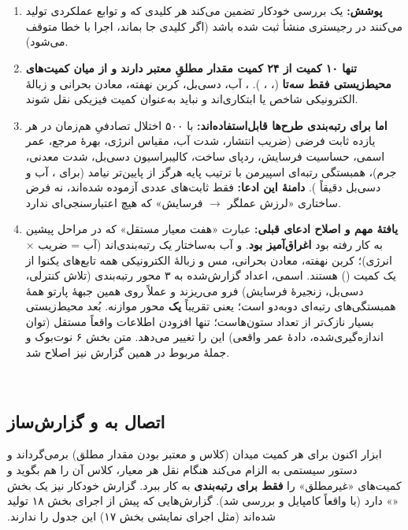 ‫\documentclass[a4paper,12pt]{article}
\begin{document}
‫\begin{enumerate}
‫\item \textbf{پوشش:} یک بررسی خودکار تضمین می‌کند هر کلیدی که  و توابع عملکردی تولید می‌کنند در رجیستری منشأ ثبت شده باشد (اگر کلیدی جا بماند، اجرا با خطا متوقف می‌شود).
‫\item \textbf{تنها ۱۰ کمیت از ۲۴ کمیت مقدار مطلقِ معتبر دارند و از میان کمیت‌های محیط‌زیستی فقط سه‌تا} (\texttt{}، \texttt{}، \texttt{}). ، آب، دسی‌بل، کربن نهفته، معادن بحرانی و زبالهٔ الکترونیکی شاخص یا ابتکاری‌اند و نباید به‌عنوان کمیت فیزیکی نقل شوند.
‫\item \textbf{اما برای رتبه‌بندی طرح‌ها قابل‌استفاده‌اند:} با ۵۰۰ اختلال تصادفیِ هم‌زمان در هر یازده ثابت فرضی (ضریب انتشار، شدت آب، مقیاس انرژی، بهرهٔ مرجع، عمر اسمی، حساسیت فرسایش، ردپای ساخت، کالیبراسیون دسی‌بل، شدت معدنی، جرم)، همبستگی رتبه‌ای اسپیرمن با ترتیب پایه هرگز از  پایین‌تر نیامد (برای ، آب و دسی‌بل دقیقاً ). \textbf{دامنهٔ این ادعا:} فقط ثابت‌های عددی آزموده شده‌اند، نه فرض ساختاری «لرزش عملگر $\to$ فرسایش» که هیچ اعتبارسنجی‌ای ندارد.
‫\item \textbf{یافتهٔ مهم و اصلاح ادعای قبلی:} عبارت «هفت معیار مستقل» که در مراحل پیشین به کار رفته بود \textbf{اغراق‌آمیز بود}.  و آب به‌ساختار یک رتبه‌بندی‌اند (آب = ضریب $\times$ انرژی)؛ کربن نهفته، معادن بحرانی، مس و زبالهٔ الکترونیکی همه تابع‌های یکنوا از یک کمیت (\texttt{}) هستند. اسمی، اعداد گزارش‌شده به ۳ محور رتبه‌بندی (تلاش کنترلی، دسی‌بل، زنجیرهٔ فرسایش) فرو می‌ریزند و عملاً روی همین جبههٔ پارتو همهٔ همبستگی‌های رتبه‌ای دوبه‌دو  است؛ یعنی تقریباً \textbf{یک} محور موازنه. بُعد محیط‌زیستی بسیار نازک‌تر از تعداد ستون‌هاست؛ تنها افزودن اطلاعات واقعاً مستقل (توان اندازه‌گیری‌شده، دادهٔ عمر واقعی) این را تغییر می‌دهد. متن بخش ۶ نوت‌بوک و جملهٔ مربوط در همین گزارش نیز اصلاح شد.
‫\end{enumerate}
‫
‫\subsection{اتصال به  و گزارش‌ساز}
‫ابزار \texttt{} اکنون برای هر کمیت میدان \texttt{} (کلاس و معتبر بودن مقدار مطلق) برمی‌گرداند و دستور سیستمی به  الزام می‌کند هنگام نقل هر معیار، کلاس آن را هم بگوید و کمیت‌های «غیرمطلق» را \textbf{فقط برای رتبه‌بندی} به کار ببرد. گزارش  خودکار نیز یک بخش «» دارد (با  واقعاً کامپایل و بررسی شد). گزارش‌هایی که پیش از اجرای بخش ۱۸ تولید شده‌اند (مثل اجرای نمایشی بخش ۱۷) این جدول را ندارند.
\end{document}
